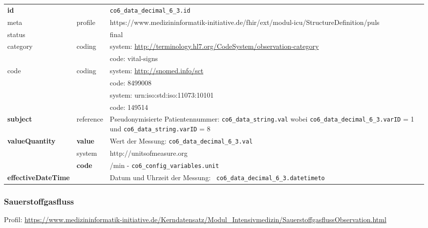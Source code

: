 \begin{longtable}{|l|l|p{7.5cm}|}
	\hline
	\rowcolor{lightgray} \multicolumn{3}{|l|}{Data Mapping (inhaltlich)} \\ \hline
	\textbf{id} &  & \texttt{co6\_data\_decimal\_6\_3.id} \\ \hline
	meta & profile & https://www.medizininformatik-initiative.de/fhir/ext/modul-icu/StructureDefinition/puls \\ \hline 
	status &  & final   \\ \hline 
	category & coding & system: \url{http://terminology.hl7.org/CodeSystem/observation-category} \\
	\cline{3-3}
	& & code: vital-signs\\ \hline
	code & coding & system: \url{http://snomed.info/sct} \\ 
	\cline{3-3} 
	&  & code: 8499008 \\  
	\cline{3-3} 
	&  & system: urn:iso:std:iso:11073:10101 \\ 
	\cline{3-3}
	&  & code: 149514 \\ \hline
	\textbf{subject} & reference & Pseudonymisierte Patientennummer: \texttt{co6\_data\_string.val} wobei \texttt{co6\_data\_decimal\_6\_3.varID} = 1 und \texttt{co6\_data\_string.varID} = 8 \\ \hline
	\textbf{valueQuantity}  & \textbf{value} & Wert der Messung: \texttt{co6\_data\_decimal\_6\_3.val} \\
	\cline{2-3}
	& system & http://unitsofmeasure.org \\
	\cline{2-3}
	& \textbf{code} & /min - \texttt{co6\_config\_variables.unit} \\ \hline
	\textbf{effectiveDateTime}  & & Datum und Uhrzeit der Messung: \texttt{
		co6\_data\_decimal\_6\_3.datetimeto} \\
	\hline
\end{longtable}

\subsubsection{Sauerstoffgasfluss} 

Profil: \url{https://www.medizininformatik-initiative.de/Kerndatensatz/Modul_Intensivmedizin/SauerstoffgasflussObservation.html}

